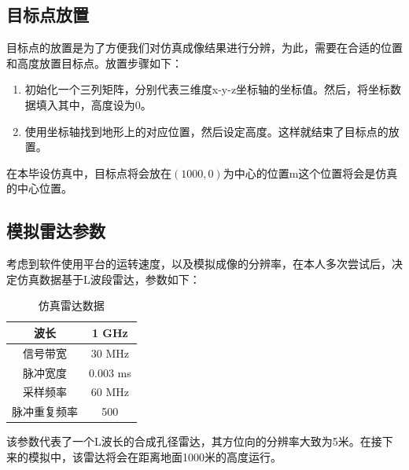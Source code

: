 \documentclass{xduugthesis}
\begin{document}
\subsection{目标点放置}
目标点的放置是为了方便我们对仿真成像结果进行分辨，为此，需要在合适的位置和高度放置目标点。放置步骤如下：\par
\begin{enumerate}
	\item 初始化一个三列矩阵，分别代表三维度x-y-z坐标轴的坐标值。然后，将坐标数据填入其中，高度设为0。
	\item 使用坐标轴找到地形上的对应位置，然后设定高度。这样就结束了目标点的放置。
\end{enumerate}
在本毕设仿真中，目标点将会放在$(1000,0)$为中心的位置m这个位置将会是仿真的中心位置。
\subsection{模拟雷达参数}
考虑到软件使用平台的运转速度，以及模拟成像的分辨率，在本人多次尝试后，决定仿真数据基于L波段雷达，参数如下：
\begin{table}[h!]
	\begin{center}
		\caption{仿真雷达数据}
		\begin{tabular}{|c|c|}
			\hline
			波长 & 1 GHz \\
			\hline
			信号带宽 & 30 MHz \\
			\hline
			脉冲宽度 & 0.003 ms  \\
			\hline
			采样频率 & 60 MHz \\
			\hline
			脉冲重复频率 & 500 \\
			\hline
		\end{tabular}
	\end{center}
\end{table}\par
该参数代表了一个L波长的合成孔径雷达，其方位向的分辨率大致为5米。在接下来的模拟中，该雷达将会在距离地面1000米的高度运行。
\end{document}
